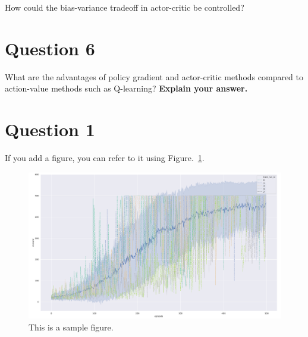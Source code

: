 \documentclass[12pt]{article}
\begin{document}
How could the bias-variance tradeoff in actor-critic be controlled?

\section*{Question 6}

What are the advantages of policy gradient and actor-critic methods
compared to action-value methods such as Q-learning? \textbf{Explain your answer.}



\pagebreak


\section{Question 1}

If you add a figure, you can refer to it using Figure.~\ref*{fig:fig1}.

\begin{figure}[h] 
	\centering  %
    \includegraphics[width=0.9\columnwidth]{img/training.pdf}
	\caption{This is a sample figure.}
	\label{fig:fig1}
\end{figure}


\end{document}

